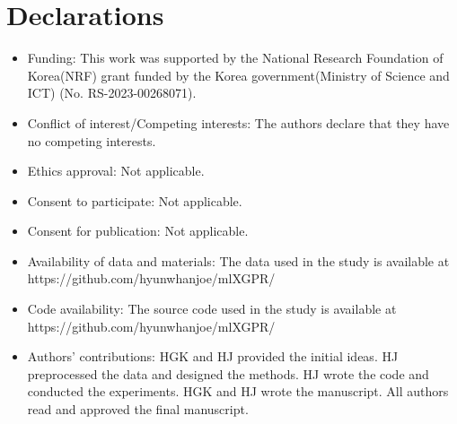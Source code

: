 \documentclass[sn-mathphys,Numbered]{sn-jnl}%
\theoremstyle{thmstyleone}%
\theoremstyle{thmstyletwo}%
\theoremstyle{thmstylethree}%
\begin{document}
\section*{Declarations}
\begin{itemize}
\item Funding: This work was supported by the National Research Foundation of Korea(NRF) grant funded by the Korea government(Ministry of Science and ICT) (No. RS-2023-00268071).
\item Conflict of interest/Competing interests: The authors declare that they have no competing interests.
\item Ethics approval: Not applicable.
\item Consent to participate: Not applicable.
\item Consent for publication: Not applicable.
\item Availability of data and materials: The data used in the study is available at https://github.com/hyunwhanjoe/mlXGPR/
\item Code availability: The source code used in the study is available at https://github.com/hyunwhanjoe/mlXGPR/
\item Authors' contributions: HGK and HJ provided the initial ideas.
HJ preprocessed the data and designed the methods. 
HJ wrote the code and conducted the experiments.
HGK and HJ wrote the manuscript.
All authors read and approved the final manuscript.

\end{itemize}





\end{document}
